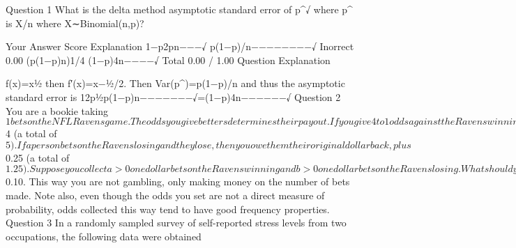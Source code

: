 Question 1
What is the delta method asymptotic standard error of p^√ where p^ is X/n where X∼Binomial(n,p)?

Your Answer		Score	Explanation
1−p2pn−−−√			
p(1−p)/n−−−−−−−−√	Inorrect	0.00	
(p(1−p)n)1/4			
(1−p)4n−−−−√			
Total		0.00 / 1.00	
Question Explanation

f(x)=x½ then f′(x)=x−½/2. Then Var(p^)=p(1−p)/n and thus the asymptotic standard error is
12p½p(1−p)n−−−−−−−√=(1−p)4n−−−−−−√
Question 2
You are a bookie taking $1 bets on the NFL Ravens game. The odds you give betters determines their payout. If you give 4 to 1 odds against the Ravens winning, then if a person bets on the Ravens winning and they win, you owe them their original dollar, plus an additional $4 (a total of $5). If a person bets on the Ravens losing and they lose, then you owe them their original dollar back, plus $0.25 (a total of $1.25).

Suppose you collect a > 0 one dollar bets on the Ravens winning and b > 0 one dollar bets on the Ravens losing. What should you set the odds so that, regardless of the outcome of the game, you neither win nor lose money? Note, in this case, the betters place their bets and learn the odds later. Note also, the odds are something that you set in this case, not a direct measure of probability or randomness.

Your Answer		Score	Explanation
(b+1)/(a+1)			
b/a			
a/b			
(a+1)/(b+1)	Inorrect	0.00	
Total		0.00 / 1.00	
Question Explanation

Suppose that you give odds against the Ravens of H. If the Ravens win, you owe
Ha+a−(a+b)
where Ha+a is the payout for those that bet on the Ravens winning, plus their original dollars back, and (a+b) is the amount of money that you collected.

If the Ravens lose, you owe
b/H+b−(a+b)
where b/H+b is the payout for those betting on the Ravens losing, plus their original dollars back and (a+b) is the amount that you collected.

Solving either equation for 0 yeilds H=b/a.

Note, how do you make money as a bookie? You charge a convenience fee for accepting the bet, say of $0.10. This way you are not gambling, only making money on the number of bets made. Note also, even though the odds you set are not a direct measure of probability, odds collected this way tend to have good frequency properties.
Question 3
In a randomly sampled survey of self-reported stress levels from two occupations, the following data were obtained

